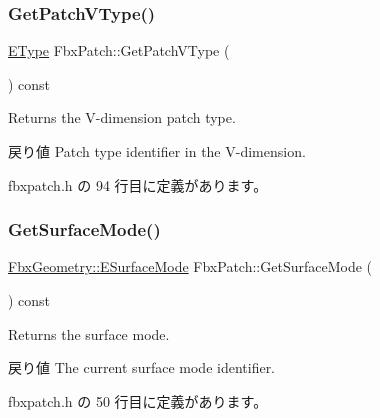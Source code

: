 \mbox{\label{class_fbx_patch_ad3648b3dedde60e7b0c9d0691c96de42}} 
\subsubsection{\texorpdfstring{Get\+Patch\+V\+Type()}{GetPatchVType()}}
{\footnotesize\ttfamily \hyperlink{class_fbx_patch_ad669936e6b844a7a15fa30ec7c183fbb}{E\+Type} Fbx\+Patch\+::\+Get\+Patch\+V\+Type (\begin{DoxyParamCaption}{ }\end{DoxyParamCaption}) const\hspace{0.3cm}{\ttfamily [inline]}}

Returns the V-\/dimension patch type. \begin{DoxyReturn}{戻り値}
Patch type identifier in the V-\/dimension. 
\end{DoxyReturn}


 fbxpatch.\+h の 94 行目に定義があります。

\mbox{\label{class_fbx_patch_a0621b866f54824bdccdbae5ae2a58e28}} 
\subsubsection{\texorpdfstring{Get\+Surface\+Mode()}{GetSurfaceMode()}}
{\footnotesize\ttfamily \hyperlink{class_fbx_geometry_adb9d2e34481a2cb40f1d783c665794db}{Fbx\+Geometry\+::\+E\+Surface\+Mode} Fbx\+Patch\+::\+Get\+Surface\+Mode (\begin{DoxyParamCaption}{ }\end{DoxyParamCaption}) const\hspace{0.3cm}{\ttfamily [inline]}}

Returns the surface mode. \begin{DoxyReturn}{戻り値}
The current surface mode identifier. 
\end{DoxyReturn}


 fbxpatch.\+h の 50 行目に定義があります。

\mbox{\label{class_fbx_patch_af134ac0b9f507a259fb20426647b49ed}} 
